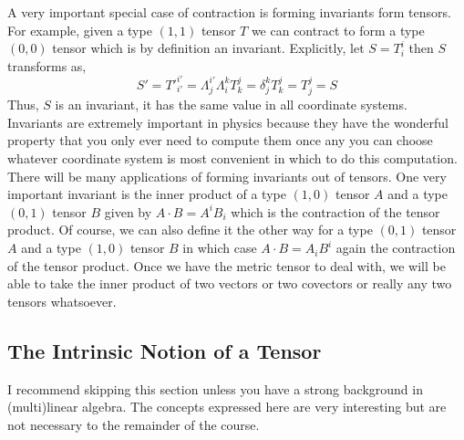 \documentclass[11pt, a4paper]{article}
\begin{document}
\par
A very important special case of contraction is forming invariants form tensors. For example, given a type $(1, 1)$ tensor $T$ we can contract to form a type $(0, 0)$ tensor which is by definition an invariant. Explicitly, let $S = T^{i}_{i}$ then $S$ transforms as,
\[ S' = T'^{i'}_{i'} = \Lambda^{i'}_{j} \Lambda_{i}^{k} T^{j}_{k} = \delta^{k}_{j} T^{j}_{k} = T^{j}_{j} = S\]
Thus, $S$ is an invariant, it has the same value in all coordinate systems. Invariants are extremely important in physics because they have the wonderful property that you only ever need to compute them once any you can choose whatever coordinate system is most convenient in which to do this computation. There will be many applications of forming invariants out of tensors. One very important invariant is the inner product of a type $(1, 0)$ tensor $A$ and a type $(0, 1)$ tensor $B$ given by $A \cdot B = A^i B_i$ which is the contraction of the tensor product. Of course, we can also define it the other way for a type $(0, 1)$ tensor $A$ and a type $(1, 0)$ tensor $B$ in which case $A \cdot B = A_i B^i$ again the contraction of the tensor product. Once we have the metric tensor to deal with, we will be able to take the inner product of two vectors or two covectors or really any two tensors whatsoever. 

\subsection{The Intrinsic Notion of a Tensor}
\begin{remark}
I recommend skipping this section unless you have a strong background in (multi)linear algebra. The concepts expressed here are very interesting but are not necessary to the remainder of the course.
\end{remark}
\end{document}
